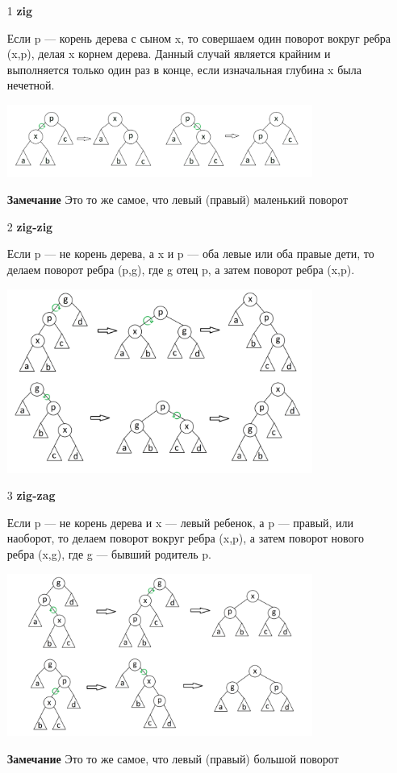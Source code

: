 \begin{itemize}
    \item [1] \textbf{zig}
    
    Если p — корень дерева с сыном x, то совершаем один поворот вокруг ребра (x,p), делая x корнем дерева. Данный случай является крайним и выполняется только один раз в конце, если изначальная глубина x была нечетной. 
    
    \includegraphics[width = 10cm]{images/47-50_зиг}
    
    \textbf{Замечание } Это то же самое, что левый (правый) маленький поворот
    
    \item[2] \textbf{zig-zig}
    
    Если p — не корень дерева, а x и p — оба левые или оба правые дети, то делаем поворот ребра (p,g), где g отец p, а затем поворот ребра (x,p).
    
    \includegraphics[width = 10cm]{images/47-50_pиг_зиг}
    
    \item[3] \textbf{zig-zag}
    
    Если p — не корень дерева и x — левый ребенок, а p — правый, или наоборот, то делаем поворот вокруг ребра (x,p), а затем поворот нового ребра (x,g), где g — бывший родитель p.
    
    \includegraphics[width = 10cm]{images/47-50_зиг_заг2}
    
     \textbf{Замечание } Это то же самое, что левый (правый) большой поворот
\end{itemize}

